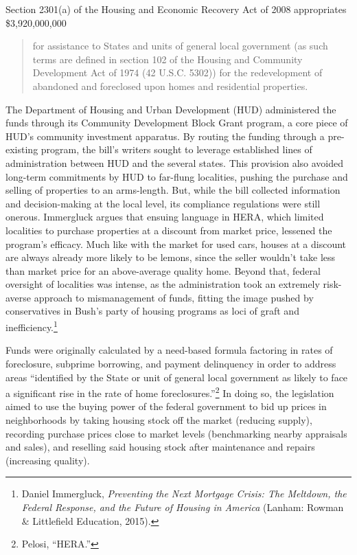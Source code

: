 \documentclass[12pt,oneside]{psthesis}
\begin{document}
Section 2301(a) of the Housing and Economic Recovery Act of 2008 appropriates \$3,920,000,000
\begin{quote}
for assistance to States and units of general local government (as such terms are defined in section 102 of the Housing and Community Development Act of 1974 (42 U.S.C. 5302)) for the redevelopment of abandoned and foreclosed upon homes and residential properties.
\end{quote}
The Department of Housing and Urban Development (HUD) administered the funds through its Community Development Block Grant program, a core piece of HUD's community investment apparatus.
By routing the funding through a pre-existing program, the bill's writers sought to leverage established lines of administration between HUD and the several states.
This provision also avoided long-term commitments by HUD to far-flung localities, pushing the purchase and selling of properties to an arms-length.
But, while the bill collected information and decision-making at the local level, its compliance regulations were still onerous.
Immergluck argues that ensuing language in HERA, which limited localities to purchase properties at a discount from market price, lessened the program's efficacy.
Much like with the market for used cars, houses at a discount are always already more likely to be lemons, since the seller wouldn't take less than market price for an above-average quality home.
Beyond that, federal oversight of localities was intense, as the administration took an extremely risk-averse approach to mismanagement of funds, fitting the image pushed by conservatives in Bush's party of housing programs as loci of graft and inefficiency.\footnote{Daniel Immergluck, \emph{Preventing the Next Mortgage Crisis: The Meltdown, the Federal Response, and the Future of Housing in America} (Lanham: Rowman \& Littlefield Education, 2015).}

Funds were originally calculated by a need-based formula factoring in rates of foreclosure, subprime borrowing, and payment delinquency in order to address areas ``identified by the State or unit of general local government as likely to face a significant rise in the rate of home foreclosures.''\footnote{Pelosi, ``HERA.''}
In doing so, the legislation aimed to use the buying power of the federal government to bid up prices in neighborhoods by taking housing stock off the market (reducing supply), recording purchase prices close to market levels (benchmarking nearby appraisals and sales), and reselling said housing stock after maintenance and repairs (increasing quality).
\end{document}

